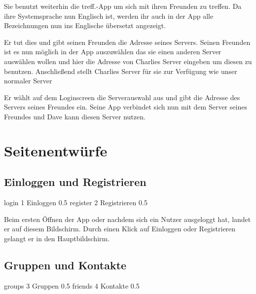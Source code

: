 \documentclass[parskip=full,11pt]{scrartcl}
\newcommand\producttitle{treff.}
\begin{document}
{Sie benutzt weiterhin die \producttitle-App um sich mit ihren Freunden zu treffen.}
{Da ihre Systemsprache nun Englisch ist, werden ihr auch in der App alle Bezeichnungen
nun ins Englische übersetzt angezeigt.}

{Er tut dies und gibt seinen Freunden die Adresse seines Servers.}
{Seinen Freunden ist es nun möglich in der App auszuwählen das sie einen anderen Server auswählen wollen und hier die Adresse von
Charlies Server eingeben um diesen zu benutzen. Anschließend stellt Charlies Server für sie zur Verfügung wie unser normaler Server}


{Er wählt auf dem Loginscreen die Serverauswahl aus und gibt die Adresse des Servers seines Freundes ein.}
{Seine App verbindet sich nun mit dem Server seines Freundes und Dave kann diesen Server nutzen.}

\pagebreak
\appendix

\section{Seitenentwürfe}

\subsection{Einloggen und Registrieren}
{login}
{1}
{Einloggen}
{0.5}
{register}
{2}
{Registrieren}
{0.5}

Beim ersten Öffnen der App oder nachdem sich ein Nutzer ausgeloggt hat, landet er auf diesem Bildschirm.
Durch einen Klick auf Einloggen oder Registrieren gelangt er in den Hauptbildschirm.

\subsection{Gruppen und Kontakte}
{groups}
{3}
{Gruppen}
{0.5}
{friends}
{4}
{Kontakte}
{0.5}
\end{document}
